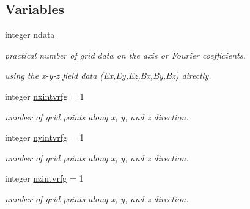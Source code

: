 \subsection*{Variables}
\begin{DoxyCompactItemize}
\item 
integer \mbox{\hyperlink{namespacedataclass_a72f075bdeedd35dc0962289e6f3461ba}{ndata}}
\begin{DoxyCompactList}\small\item\em practical number of grid data on the axis or Fourier coefficients. \end{DoxyCompactList}\end{DoxyCompactItemize}
\textbf{ }\par
{\em using the x-\/y-\/z field data (Ex,Ey,Ez,Bx,By,Bz) directly. }\begin{DoxyCompactItemize}
\item 
integer \mbox{\hyperlink{namespacedataclass_a6302bc97206196f7003db67abd75507e}{nxintvrfg}} = 1
\begin{DoxyCompactList}\small\item\em number of grid points along x, y, and z direction. \end{DoxyCompactList}\item 
integer \mbox{\hyperlink{namespacedataclass_a32c01f4c7d58343edc8d318b2e5f4760}{nyintvrfg}} = 1
\begin{DoxyCompactList}\small\item\em number of grid points along x, y, and z direction. \end{DoxyCompactList}\item 
integer \mbox{\hyperlink{namespacedataclass_a53f757bd562f34f7e8e6bb58606fc289}{nzintvrfg}} = 1
\begin{DoxyCompactList}\small\item\em number of grid points along x, y, and z direction. \end{DoxyCompactList}\end{DoxyCompactItemize}

